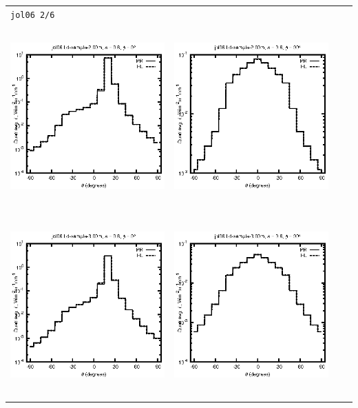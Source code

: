 \begin{tabular}{c c c c}
\multicolumn{4}{l}{\texttt{jol06 2/6}} \\
\includegraphics[height=7cm]{../eps/jol06_Ld_sample_2.00m_fwd.eps} &
\includegraphics[height=7cm]{../eps/jol06_Ld_sample_2.00m_cross.eps} \\
\includegraphics[height=7cm]{../eps/jol06_Ld_sample_3.00m_fwd.eps} &
\includegraphics[height=7cm]{../eps/jol06_Ld_sample_3.00m_cross.eps} \\

\end{tabular}
